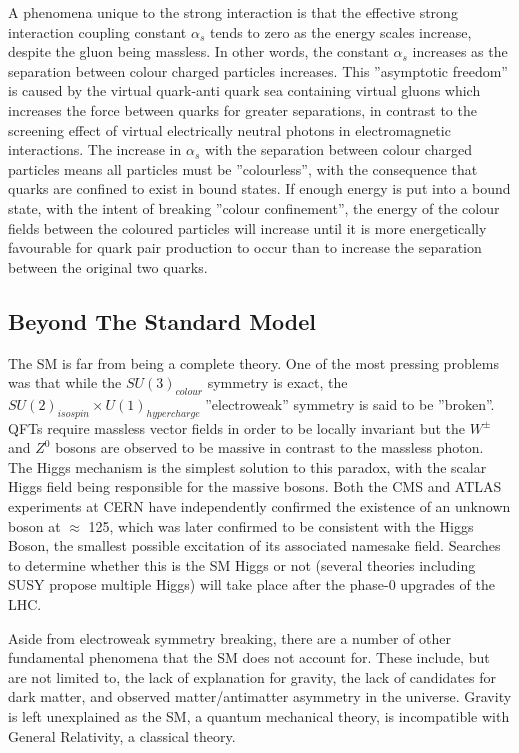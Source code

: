 A phenomena unique to the strong interaction is that the effective strong interaction coupling constant $\alpha_{s}$ tends to zero as the energy scales increase, despite the gluon being massless. 
In other words, the constant $\alpha_{s}$ increases as the separation between colour charged particles increases. 
This ''asymptotic freedom'' is caused by the virtual quark-anti quark sea containing virtual gluons which increases the force between quarks for greater separations, in contrast to the screening effect of virtual electrically neutral photons in electromagnetic interactions. 
The increase in $\alpha_{s}$ with the separation between colour charged particles means all particles must be ''colourless'', with the consequence that quarks are confined to exist in bound states. 
If enough energy is put into a bound state, with the intent of breaking ''colour confinement'', the energy of the colour fields between the coloured particles will increase until it is more energetically favourable for quark pair production to occur than to increase the separation between the original two quarks. 

\subsection{Beyond The Standard Model}\label{bsm}

The SM is far from being a complete theory. 
One of the most pressing problems was that while the $SU(3)_{colour}$ symmetry is exact, the $SU(2)_{isospin} \times U(1)_{hypercharge}$ ''electroweak'' symmetry is said to be ''broken''. 
QFTs require massless vector fields in order to be locally invariant but the $W^{\pm}$ and $Z^{0}$ bosons are observed to be massive in contrast to the massless photon. 
The Higgs mechanism is the simplest solution to this paradox, with the scalar Higgs field being responsible for the massive bosons. 
Both the CMS and ATLAS experiments at CERN have independently confirmed the existence of an unknown boson at $\approx$ 125\GeV, which was later confirmed to be consistent with the Higgs Boson, the smallest possible excitation of its associated namesake field. 
Searches to determine whether this is the SM Higgs or not (several theories including SUSY propose multiple Higgs) will take place after the phase-0 upgrades of the LHC. 

Aside from electroweak symmetry breaking, there are a number of other fundamental phenomena that the SM does not account for. 
These include, but are not limited to, the lack of explanation for gravity, the lack of candidates for dark matter, and observed matter/antimatter asymmetry in the universe. 
Gravity is left unexplained as the SM, a quantum mechanical theory, is incompatible with General Relativity, a classical theory. 

